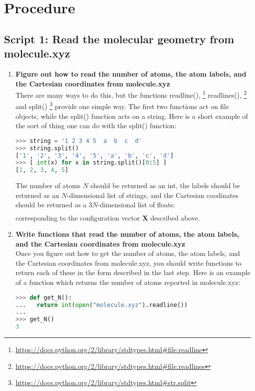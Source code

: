 \documentclass[11pt]{article}
\newcommand{\ttf}[1]{{\ttfamily #1}}
\newcommand{\bo}[1]{\ensuremath{\mathbf{#1}}}
\begin{document}
\newpage
\section{Procedure}
\subsection{Script 1: Read the molecular geometry from \ttf{molecule.xyz}}
\begin{enumerate}[label=\textbf{\arabic*}]
\item {\bf Figure out how to read the number of atoms, the atom labels, and the Cartesian coordinates from \ttf{molecule.xyz}}\\
There are many ways to do this, but the functions \ttf{readline()}, \footnote{\url{https://docs.python.org/2/library/stdtypes.html\#file.readline}} \ttf{readlines()}, \footnote{\url{https://docs.python.org/2/library/stdtypes.html\#file.readlines}} and \ttf{split()} \footnote{\url{https://docs.python.org/2/library/stdtypes.html\#str.split}} provide one simple way.
The first two functions act on file objects, while the \ttf{split()} function acts on a string.
Here is a short example of the sort of thing one can do with the \ttf{split()} function:
\begin{addmargin}{2cm}{}
\begin{lstlisting}[language=python]
>>> string = '1 2 3 4 5  a  b  c  d'
>>> string.split()
['1', '2', '3', '4', '5', 'a', 'b', 'c', 'd']
>>> [ int(x) for x in string.split()[0:5] ]
[1, 2, 3, 4, 5]
\end{lstlisting}
\end{addmargin}
The number of atoms $N$ should be returned as an \ttf{int}, the labels should be returned as an $N$-dimensional list of strings, and the Cartesian coodinates should be returned as a $3N$-dimensional list of \ttf{float}s:
\begin{align}
	[x_1,y_1,z_1,\ldots,x_N,y_N,z_N]
	\label{coords}
\end{align}
corresponding to the configuration vector $\bo{X}$ described above.
\item {\bf Write functions that read the number of atoms, the atom labels, and the Cartesian coordinates from \ttf{molecule.xyz}}\\
Once you figure out how to get the number of atoms, the atom labels, and the Cartesian coordinates from \ttf{molecule.xyz}, you should write functions to return each of these in the form described in the last step.
Here is an example of a function which returns the number of atoms reported in \ttf{molecule.xyz}:
\begin{addmargin}{2cm}{}
\begin{lstlisting}[language=python]
>>> def get_N():
...   return int(open("molecule.xyz").readline())
... 
>>> get_N()
3
\end{lstlisting}
\end{addmargin}



\end{enumerate}
\end{document}
